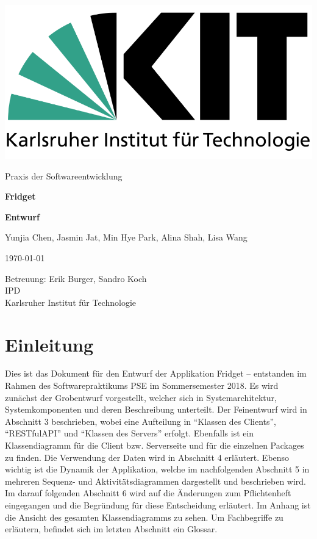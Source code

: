 \documentclass[a4paper]{scrreprt}
\begin{document}
	
	 \begin{flushright}
		\includegraphics[scale = 0.2]{kit-logo.png}\\[0.5cm]
	\end{flushright}
	\vspace*{2cm}

\begin{center} 
	\large Praxis der Softwareentwicklung
	\vspace*{1.5cm}
	
	\textbf{\huge Fridget}
	\vspace*{1cm}
	
	\textbf{\Large Entwurf}
	\vspace*{2cm}
	
	Yunjia Chen, Jasmin Jat, Min Hye Park, Alina Shah, Lisa Wang
	\vspace*{1cm}
	
	\today
	\vspace*{2.5cm}
	
	Betreuung: Erik Burger, Sandro Koch\\[0.5cm]
	IPD\\[0.5cm]
	
	Karlsruher Institut für Technologie
	
\end{center}

\thispagestyle{empty}

\tableofcontents 

\newpage
\chapter{Einleitung}
Dies ist das Dokument für den Entwurf der Applikation Fridget – entstanden im Rahmen
des Softwarepraktikums PSE im Sommersemester 2018.
Es wird zunächst der Grobentwurf vorgestellt, welcher sich in Systemarchitektur, Systemkomponenten
und deren Beschreibung unterteilt.
Der Feinentwurf wird in Abschnitt 3 beschrieben, wobei eine Aufteilung in “Klassen des
Clients”, “RESTfulAPI” und “Klassen des Servers” erfolgt. Ebenfalls ist ein Klassendiagramm
für die Client bzw. Serverseite und für die einzelnen Packages zu finden.
Die Verwendung der Daten wird in Abschnitt 4 erläutert.
Ebenso wichtig ist die Dynamik der Applikation, welche im nachfolgenden Abschnitt 5 in
mehreren Sequenz- und Aktivitätsdiagrammen dargestellt und beschrieben wird.
Im darauf folgenden Abschnitt 6 wird auf die Änderungen zum Pflichtenheft eingegangen
und die Begründung für diese Entscheidung erläutert.
Im Anhang ist die Ansicht des gesamten Klassendiagramms zu sehen.
Um Fachbegriffe zu erläutern, befindet sich im letzten Abschnitt ein Glossar.
\end{document}
